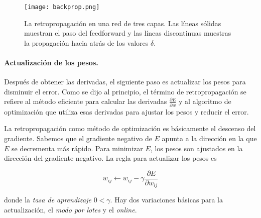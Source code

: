 



\begin{figure}
    \centering
    \texttt{[image: backprop.png]}
    \caption{La retropropagación en una red de tres capas. Las líneas sólidas muestran el paso
    del feedforward y las líneas discontinuas muestras la propagación hacia atrás de los valores $\delta$.}
    \label{fig:backprop}
\end{figure}
\paragraph{Actualización de los pesos.}

Después de obtener las derivadas, el siguiente paso es actualizar los pesos
para disminuir el error. Como se dijo al principio, el término 
de retropropagación se refiere al método eficiente para calcular las 
derivadas $\frac{\partial E}{\partial w}$ y al algoritmo de optimización
que utiliza esas derivadas para ajustar los pesos y reducir el error.

La retropropagación como método de optimización es básicamente el 
descenso del gradiente. Sabemos que el gradiente negativo de $E$ apunta a la
dirección en la que $E$ se decrementa más rápido. Para minimizar $E$,
los pesos son ajustados en la dirección del gradiente negativo. La regla para
actualizar los pesos es

\[
w_{ij} \leftarrow  w_{ij} - \gamma \frac{\partial E}{\partial w_{ij}}
\]

donde la \textit{tasa de aprendizaje} $0 < \gamma$.
Hay dos variaciones básicas para la actualización, el \textit{modo por lotes} y 
el \textit{online}.

